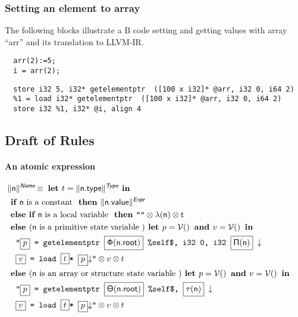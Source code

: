 \documentclass[10pt,a4paper]{article}
\newcommand{\trad}[2]{\ensuremath{\lVert \textsf{#1} \rVert^{\textit{#2}}}}
\newcommand{\nl}[0]{\ensuremath{\downarrow}}
\DeclareMathOperator{\isdef}{\equiv}
\DeclareMathOperator{\variable}{\mathcal{V}()}
\newcommand{\llvm}[1]{\texttt{#1}}
\newcommand{\B}[1]{\textsf{#1}}
\newcommand{\IF}[0]{\textbf{ if }}
\newcommand{\ELSIF}[0]{\textbf{ else if }}
\newcommand{\ELSE}[0]{\textbf{ else }}
\newcommand{\THEN}[0]{\textbf{ then }}
\newcommand{\LET}[0]{\textbf{ let }}
\newcommand{\IN}[0]{\textbf{ in }}
\newcommand{\AND}[0]{\textbf{ and }}
\newcommand{\PH}[1]{\framebox{$#1$}}
\newcommand{\sep}[0]{\otimes}
\newcommand{\local}[0]{\ensuremath{\sf\lambda}}
\newcommand{\idx}[0]{\ensuremath{\sf\Pi}}
\newcommand{\state}[0]{\ensuremath{\sf\Theta}}
\newcommand{\stateref}[0]{\ensuremath{\sf\Phi}}
\newcommand{\stateindex}[0]{\ensuremath{\sf\tau}}
\begin{document}
\iffalse
\begin{verbatim}
<temporary variable> = getelementptr  
  [<number of elements> x <element type>]   * @<variable_name>, 
  <type and index of pointer> <index_value>,
  <type and index. ex:i64>  <index_value>
\end{verbatim}
\fi

\subsubsection{Setting an element to array}

The following blocks illustrate a B code setting and getting values with array
``arr''  and its translation to LLVM-IR. 
\begin{footnotesize}

\begin{verbatim}
  arr(2):=5;
  i = arr(2);
\end{verbatim}
\end{footnotesize}

\begin{footnotesize}
\begin{verbatim}
  store i32 5, i32* getelementptr  ([100 x i32]* @arr, i32 0, i64 2)
  %1 = load i32* getelementptr  ([100 x i32]* @arr, i32 0, i64 2)
  store i32 %1, i32* @i, align 4
\end{verbatim}
\end{footnotesize}



\subsection{Draft of Rules}

\paragraph{An atomic expression}

\begin{align*}
\lefteqn{\trad{n}{\B{Name}} \isdef \LET t = \trad{n.type}{\B{Type}} \IN} \\
& \IF \B{n} \mbox{ is a constant } \THEN \trad{n.value}{\B{Expr}} \\
& \ELSIF \B{n} \mbox{ is a local variable } \THEN
\llvm{""} \sep \local(\B{n}) \sep t \\
& \ELSE (\B{n} \mbox{ is a primitive state variable }) \LET p = \variable \AND v = \variable \IN \\
& \quad \llvm{"\PH{p} = getelementptr  \PH{\stateref(\B{n.root})} \%self\$, i32 0, i32 \PH{\idx(\B{n})} \nl} \\
& \quad \llvm{\PH{v} = load \PH{t}* \PH{p}\nl"} \sep v \sep t\\
& \ELSE (\B{n} \mbox{ is an array or structure state variable }) \LET p = \variable \AND v = \variable \IN \\
& \quad \llvm{"\PH{p} = getelementptr \PH{\state(\B{n.root})} \%self\$,
\PH{\stateindex(n)} \nl} \\
& \quad \llvm{\PH{v} = load \PH{t}* \PH{p}\nl"} \sep v \sep t
\
\end{align*}
\end{document}

